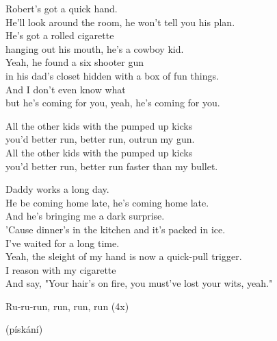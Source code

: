
\ve{}
Robert's got a quick hand.\\
He'll look around the room, he won't tell you his plan.\\
He's got a rolled cigarette \\
hanging out his mouth, he's a cowboy kid.\\
Yeah, he found a six shooter gun \\
in his dad's closet hidden with a box of fun things.\\
And I don't even know what \\
but he's coming for you, yeah, he's coming for you.

All the other kids with the pumped up kicks\\
you'd better run, better run, outrun my gun.\\
All the other kids with the pumped up kicks\\
you'd better run, better run faster than my bullet.

\ve{}
Daddy works a long day.\\
He be coming home late, he's coming home late.\\
And he's bringing me a dark surprise.\\
'Cause dinner's in the kitchen and it's packed in ice.\\
I've waited for a long time.\\
Yeah, the sleight of my hand is now a quick-pull trigger.\\
I reason with my cigarette\\
And say, "Your hair's on fire, you must've lost your wits, yeah."


\re{}
Ru-ru-run, run, run, run (4x)

\re{}
(pískání)


\esong{}
